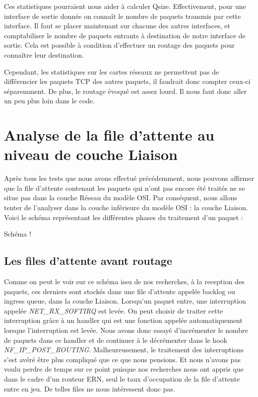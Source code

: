 \documentclass[a4paper]{article}
\begin{document}
Ces statistiques pourraient nous aider à calculer Qsize. 
Effectivement, pour une interface de sortie donnée on connaît le
nombre de paquets transmis par cette interface.
Il faut se placer maintenant sur chacune des autres interfaces, et
comptabiliser le nombre de paquets entrants à destination
de notre interface de sortie. Cela est possible à condition
d'effectuer un routage des paquets pour connaître leur destination.

Cependant, les statistiques sur les cartes réseaux ne permettent pas de
différencier les paquets TCP des autres paquets, il faudrait
donc compter ceux-ci séparemment. De plus, le routage évoqué
est assez lourd. Il nous faut donc aller un peu plus loin dans le code.

\section{Analyse de la file d'attente au niveau de couche Liaison}

Après tous les tests que nous avons effectué précédemment, nous pouvons affirmer
 que la file d'attente contenant les paquets qui n'ont pas encore été traités ne
  se situe pas dans la couche Réseau du modèle 
  OSI. Par conséquent, nous allons tenter de l'analyser dans la couche
   inférieure du modèle OSI : la couche Liaison. Voici le schéma représentant
    les différentes phases du traitement d'un paquet :

Schéma !

\subsection{Les files d'attente avant routage}
Comme on peut le voir sur ce schéma issu de nos recherches, à la reception des paquets, ces derniers sont stockés dans une file d'attente appelée backlog \cite{10poin} ou ingress queue, dans la couche Liaison.
Lorsqu'un paquet entre, une interruption appelée \textit{NET\_RX\_SOFTIRQ} est levée. On peut choisir de traiter cette interruption grâce à un handler qui est une fonction appelée automatiquement lorsque l'interruption est levée. Nous avons donc essayé d'incrémenter le nombre de paquets dans ce handler et de continuer à le décrémenter  dans le hook \textit{NF\_IP\_POST\_ROUTING}. Malheureusement, le traitement des interruptions s'est avéré être plus compliqué que ce que nous pensions. Et nous n'avons pas voulu perdre de temps sur ce point puisque nos recherches nous ont appris que dans le cadre d'un routeur ERN, seul le taux d'occupation de la file d'attente entre en jeu. De telles files ne nous intéressent donc pas. 
\end{document}
